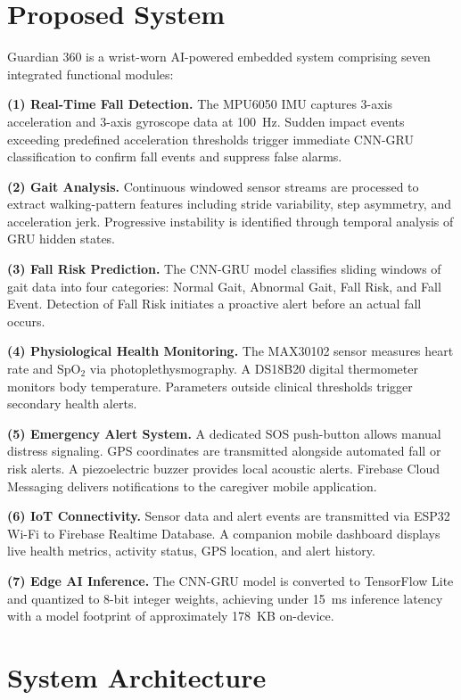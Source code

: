 \documentclass[conference]{IEEEtran}
\begin{document}
\section{Proposed System}

Guardian 360 is a wrist-worn AI-powered embedded system comprising seven integrated functional modules:

\textbf{(1) Real-Time Fall Detection.} The MPU6050 IMU captures 3-axis acceleration and 3-axis gyroscope data at 100~Hz. Sudden impact events exceeding predefined acceleration thresholds trigger immediate CNN-GRU classification to confirm fall events and suppress false alarms.

\textbf{(2) Gait Analysis.} Continuous windowed sensor streams are processed to extract walking-pattern features including stride variability, step asymmetry, and acceleration jerk. Progressive instability is identified through temporal analysis of GRU hidden states.

\textbf{(3) Fall Risk Prediction.} The CNN-GRU model classifies sliding windows of gait data into four categories: Normal Gait, Abnormal Gait, Fall Risk, and Fall Event. Detection of Fall Risk initiates a proactive alert before an actual fall occurs.

\textbf{(4) Physiological Health Monitoring.} The MAX30102 sensor measures heart rate and SpO$_2$ via photoplethysmography. A DS18B20 digital thermometer monitors body temperature. Parameters outside clinical thresholds trigger secondary health alerts.

\textbf{(5) Emergency Alert System.} A dedicated SOS push-button allows manual distress signaling. GPS coordinates are transmitted alongside automated fall or risk alerts. A piezoelectric buzzer provides local acoustic alerts. Firebase Cloud Messaging delivers notifications to the caregiver mobile application.

\textbf{(6) IoT Connectivity.} Sensor data and alert events are transmitted via ESP32 Wi-Fi to Firebase Realtime Database. A companion mobile dashboard displays live health metrics, activity status, GPS location, and alert history.

\textbf{(7) Edge AI Inference.} The CNN-GRU model is converted to TensorFlow Lite and quantized to 8-bit integer weights, achieving under 15~ms inference latency with a model footprint of approximately 178~KB on-device.

\section{System Architecture}
\end{document}
